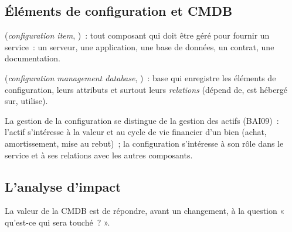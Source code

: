 \subsection{Éléments de configuration et CMDB}

\begin{boxdef}
(\textit{configuration item}, )~: tout composant qui doit être
géré pour fournir un service~: un serveur, une application, une base de
données, un contrat, une documentation.

\medskip
{}
(\textit{configuration management database}, )~: base qui
enregistre les éléments de configuration, leurs attributs et surtout
leurs \emph{relations} (dépend de, est hébergé sur, utilise).
\end{boxdef}

La gestion de la configuration se distingue de la gestion des actifs
(BAI09)~: l'actif s'intéresse à la valeur et au cycle de vie financier
d'un bien (achat, amortissement, mise au rebut)~; la configuration
s'intéresse à son rôle dans le service et à ses relations avec les autres
composants.

\subsection{L'analyse d'impact}

La valeur de la CMDB est de répondre, avant un changement, à la question
« qu'est-ce qui sera touché~? ».

